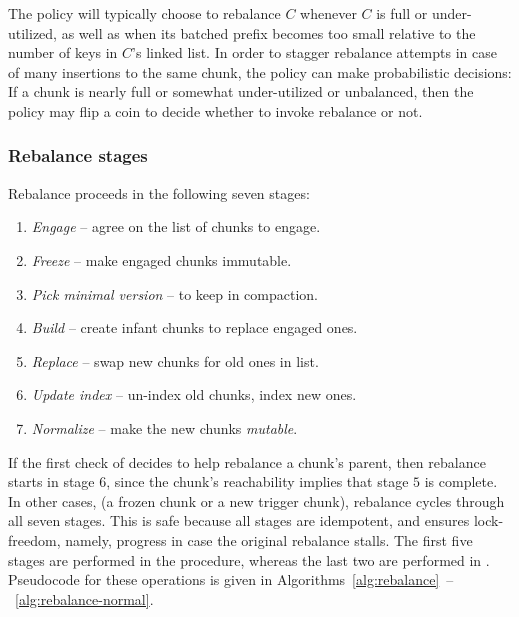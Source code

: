 The  policy will typically choose to rebalance $C$ whenever $C$ is full or under-utilized, as well as when
its  batched prefix becomes too small relative to the number of keys in $C$'s linked list.
In order to stagger rebalance attempts in case of many insertions to the same chunk,
the policy can make probabilistic decisions:  If a chunk  is nearly full or somewhat under-utilized or
unbalanced, then the policy may flip a coin to decide whether to invoke rebalance or not.

\subsubsection{Rebalance stages}
\label{sec:rebalance-stages}

\remove{
\newenvironment{compactenum}
{ \begin{enumerate}
    \setlength{\itemsep}{0pt}
    \setlength{\parskip}{0pt}
    \setlength{\parsep}{2pt}     }
{ \end{enumerate}      }
}

Rebalance  proceeds in the following seven stages:
\begin{enumerate}
\item \emph{Engage} -- agree on the list of chunks to engage.
\item \emph{Freeze}  -- make engaged chunks immutable.
\item \emph{Pick minimal version} --  to keep in compaction.
\item \emph{Build} -- create infant chunks to replace engaged ones.
\item \emph{Replace} -- swap new chunks for old ones in  list.
\item \emph{Update index} -- un-index old chunks,  index new ones.
\item \emph{Normalize} -- make the new chunks \emph{mutable}.
\end{enumerate}

If the first check of  decides to help rebalance a chunk's parent, then
rebalance starts in stage $6$, since the chunk's reachability implies that stage $5$ is complete.
In other cases, (a frozen chunk or a new trigger chunk), rebalance cycles through all seven stages.
This is safe because all stages are idempotent, and ensures lock-freedom, namely, progress in case the original rebalance stalls.
The first five stages are performed in the  procedure, whereas the last two are performed in .
Pseudocode for these operations is given in Algorithms~\ref{alg:rebalance}~--~\ref{alg:rebalance-normal}.



